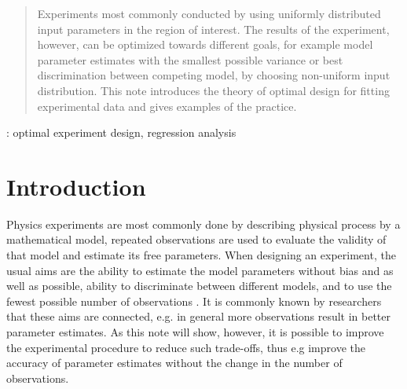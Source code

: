 \documentclass[12pt]{iopart}
\begin{document}
\author{G Imreh and W-Y Cheng}
\address{Institute of Atomic and Molecular Sciences, Academia Sinica, Taiwan}
\begin{abstract}
Experiments most commonly conducted by using uniformly distributed input parameters in the region of interest. The results of the experiment, however, can be optimized towards different goals, for example model parameter estimates with the smallest possible variance or best discrimination between competing model, by choosing non-uniform input distribution. This note introduces the theory of optimal design for fitting experimental data and gives examples of the practice.
\end{abstract}

: optimal experiment design, regression analysis

\submitto{\MST}



\section{Introduction}

Physics experiments are most commonly done by describing physical process by a mathematical model, repeated observations are used to evaluate the validity of that model and estimate its free parameters. When designing an experiment, the usual aims are the ability to estimate the model parameters without bias and as well as possible, ability to discriminate between different models, and to use the fewest possible number of observations \cite{Box1975,Box1987}. It is commonly known by researchers that these aims are connected, e.g. in general more observations result in better parameter estimates. As this note will show, however, it is possible to improve the experimental procedure to reduce such trade-offs, thus e.g improve the accuracy of parameter estimates without the change in the number of observations.
\end{document}
